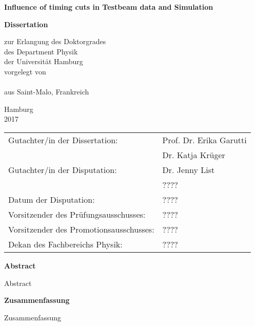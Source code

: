 \begin{titlepage}

\thispagestyle{empty}
\begin{center}
\null
\vfill
{\huge \bf Influence of timing cuts in Testbeam data and Simulation\\}

\vspace{4cm}

{\LARGE \bf Dissertation\\}

\vspace{0.5cm}
{\Large
  zur Erlangung des Doktorgrades\\
  des Department Physik\\
  der Universit\"{a}t Hamburg\\
  \vspace{2.5cm}
  vorgelegt von\\
  \vspace{0.5cm}
  \makeatletter
  \textsc{\@author}\\
  \makeatother
  \vspace{0.5cm}
  aus Saint-Malo, Frankreich\\

  \vfill

  Hamburg\\
  2017\\
 }

 \newpage
 \thispagestyle{empty}
 \null
 \vfill
 \begin{tabular}{ll}
   Gutachter/in der Dissertation: & Prof. Dr. Erika Garutti\\
                                  & Dr. Katja Kr\"uger\\[3mm]
   Gutachter/in der Disputation: & Dr. Jenny List\\
                                 & ????\\[3mm]
   Datum der Disputation: & ????\\[3mm]
   Vorsitzender des Pr\"{u}fungsausschusses: & ????\\[3mm]
   Vorsitzender des Promotionsausschusses: & ????\\[3mm]
   Dekan des Fachbereichs Physik:& ????\\[3mm]
 \end{tabular}

\end{center}

\newpage
\thispagestyle{empty}
\begin{center}
{\bf Abstract}
\end{center}
Abstract

\newpage
\thispagestyle{empty}
\begin{center}
{\bf Zusammenfassung}
\end{center}
Zusammenfassung

\end{titlepage}

\newpage

\tableofcontents
